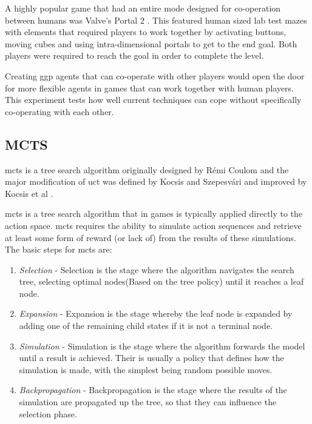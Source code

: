 \documentclass{IEEEtran}
\begin{document}
A highly popular game that had an entire mode designed for co-operation between humans was Valve's Portal 2 \cite{portal2}. This featured human sized lab test mazes with elements that required players to work together by activating buttons, moving cubes and using intra-dimensional portals to get to the end goal. Both players were required to reach the goal in order to complete the level.

Creating \gls{ggp} agents that can co-operate with other players would open the door for more flexible agents in games that can work together with human players. This experiment tests how well current techniques can cope without specifically co-operating with each other.

\subsection{MCTS}

\gls{mcts} is a tree search algorithm originally designed by R{\'e}mi Coulom \cite{coulom2007efficient} and the major modification of \gls{uct} was defined by Kocsis and Szepesv{\'a}ri \cite{kocsis2006bandit} and improved by Kocsis et al \cite{kocsis2006improved}.

\gls{mcts} is a tree search algorithm that in games is typically applied directly to the action space. \gls{mcts} requires the ability to simulate action sequences and retrieve at least some form of reward (or lack of) from the results of these simulations. The basic steps for \gls{mcts} are:

\begin{enumerate}
\item{\emph{Selection} - Selection is the stage where the algorithm navigates the search tree, selecting optimal nodes(Based on the tree policy) until it reaches a leaf node.}
\item{\emph{Expansion} - Expansion is the stage whereby the leaf node is expanded by adding one of the remaining child states if it is not a terminal node.}
\item{\emph{Simulation} - Simulation is the stage where the algorithm forwards the model until a result is achieved. Their is usually a policy that defines how the simulation is made, with the simplest being random possible moves.}
\item{\emph{Backpropagation} - Backpropagation is the stage where the results of the simulation are propagated up the tree, so that they can influence the selection phase.}
\end{enumerate}
\end{document}
